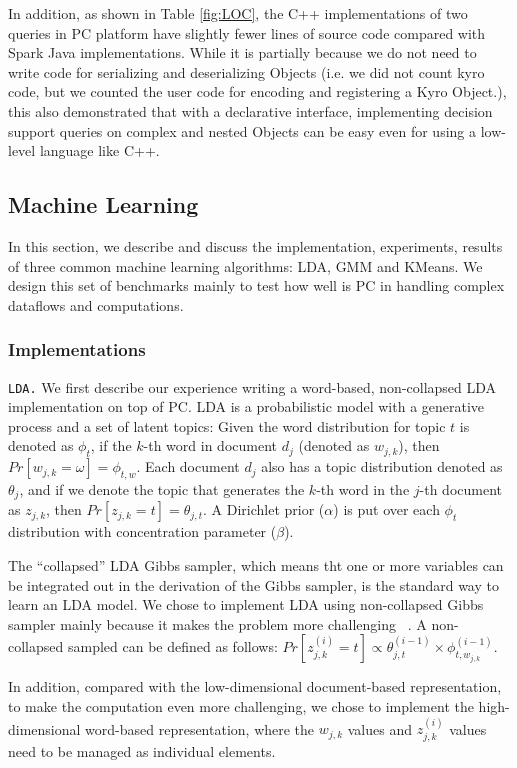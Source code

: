 In addition, as shown in Table \ref{fig:LOC}, the C++ implementations of two queries in
PC platform have slightly fewer lines of source code compared with
Spark Java implementations. While it is partially because we do not
need to write code for serializing and deserializing Objects (i.e. we did not
count kyro code, but we counted the user code for encoding and
registering a Kyro Object.), this also demonstrated that with a
declarative interface, implementing decision support
queries on complex and nested Objects can be easy even for using a low-level language like C++.

\subsection {Machine Learning}
In this section, we describe and discuss the implementation,
experiments, results of three common machine learning algorithms: LDA,
GMM and KMeans. We design this set of benchmarks mainly to test how
well is PC in handling complex dataflows and computations.

\subsubsection {Implementations}
\noindent
\texttt {LDA.} We first describe our experience writing a word-based,
non-collapsed LDA implementation \cite{jermaineExperimental} on top of
PC.  LDA is a probabilistic model with a generative process and a set
of latent topics: Given the word distribution for topic $t$ is denoted
as $\phi_{t}$, if the
$k$-th word in document $d_j$ (denoted as $w_{j,k}$), then
$Pr[w_{j,k}=\omega]=\phi_{t,w}$. Each document $d_j$ also has a topic
distribution denoted as $\theta_j$, and if we denote the topic that
generates the $k$-th word in the $j$-th document as $z_{j,k}$, then
$Pr[z_{j,k}=t]=\theta_{j,t}$. A Dirichlet prior ($\alpha$) is
put over each $\phi_{t}$ distribution with concentration parameter
($\beta$).

The
``collapsed'' LDA Gibbs sampler, which means tht one or more variables
can be integrated out in the derivation of the Gibbs sampler, is the
standard way to learn an LDA model. We chose to implement
LDA using non-collapsed Gibbs sampler mainly because it makes the
problem more challenging ~\cite{jermaineExperimental}.  A
non-collapsed sampled can be defined as follows:
$Pr[z_{j,k}^{(i)}=t] \propto \theta_{j,t}^{(i-1)} \times \phi_{t, w_{j,k}}^{(i-1)}$.


In addition,
compared with the low-dimensional document-based representation, to
make the computation even more challenging, we
chose to implement the high-dimensional word-based representation,
where the $w_{j,k}$ values and $z_{j,k}^{(i)}$ values need to be managed as
individual elements. 



